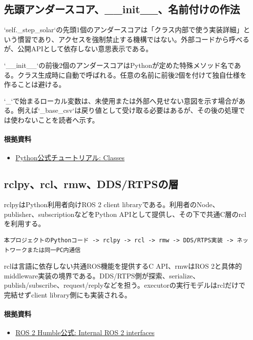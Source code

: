 \documentclass[a4paper,11pt]{article}
\begin{document}
\subsection{先頭アンダースコア、\_\_init\_\_、名前付けの作法}
`self.\_step\_solar`の先頭1個のアンダースコアは「クラス内部で使う実装詳細」という慣習であり、アクセスを強制禁止する機構ではない。外部コードから呼べるが、公開APIとして依存しない意思表示である。


`\_\_init\_\_`の前後2個のアンダースコアはPythonが定めた特殊メソッド名である。クラス生成時に自動で呼ばれる。任意の名前に前後2個を付けて独自仕様を作ることは避ける。


`\_`で始まるローカル変数は、未使用または外部へ見せない意図を示す場合がある。例えば`\_base\_csv`は戻り値として受け取る必要はあるが、その後の処理では使わないことを読者へ示す。

\paragraph{根拠資料}
\begin{itemize}[leftmargin=1.6em]
\item \href{https://docs.python.org/3/tutorial/classes.html}{Python公式チュートリアル: Classes}
\end{itemize}

\subsection{rclpy、rcl、rmw、DDS/RTPSの層}
rclpyはPython利用者向けROS 2 client libraryである。利用者のNode、publisher、subscriptionなどをPython APIとして提供し、その下で共通C層のrclを利用する。


\begin{lstlisting}
本プロジェクトのPythonコード -> rclpy -> rcl -> rmw -> DDS/RTPS実装 -> ネットワークまたは同一PC内通信
\end{lstlisting}


rclは言語に依存しない共通ROS機能を提供するC API、rmwはROS 2と具体的middleware実装の境界である。DDS/RTPS側が探索、serialize、publish/subscribe、request/replyなどを担う。executorの実行モデルはrclだけで完結せずclient library側にも実装される。

\paragraph{根拠資料}
\begin{itemize}[leftmargin=1.6em]
\item \href{https://docs.ros.org/en/humble/Concepts/About-Internal-Interfaces.html}{ROS 2 Humble公式: Internal ROS 2 interfaces}
\end{itemize}
\end{document}
